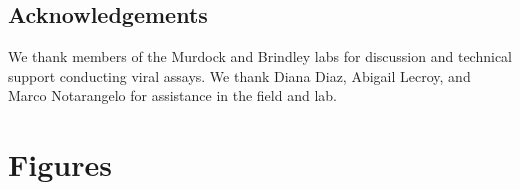 \documentclass[doublespacing, linenumbers]{bmcart}
\begin{document}
\begin{backmatter}
\subsection*{Acknowledgements}
We thank members of the Murdock and Brindley labs for discussion and technical support conducting viral assays. We thank Diana Diaz, Abigail Lecroy, and Marco Notarangelo for assistance in the field and lab.






\section*{Figures}


\end{backmatter}
\end{document}
